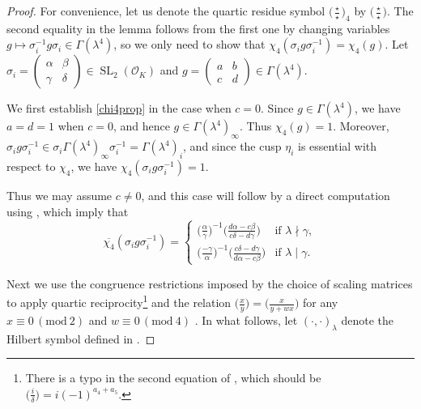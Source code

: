 \documentclass[12pt,reqno]{amsart}
\numberwithin{equation}{section}
\renewcommand{\pmod}[1]{\, (\mathrm{mod}\ #1)}
\DeclareMathOperator{\SL}{SL}
\begin{document}
\begin{proof}
    For convenience, let us denote the quartic residue symbol $\big(\frac{\star}{\star}\big)_4$ by $\big(\frac{\star}{\star}\big)$. The second equality in the lemma follows from the first one by changing variables $g \mapsto \sigma_i^{-1} g \sigma_i \in \Gamma(\lambda^4)$, so we only need to show that $\chi_4(\sigma_i g \sigma_i^{-1}) = \chi_4(g)$.
  Let  $\sigma_i = \left(\begin{smallmatrix}
        \alpha & \beta \\ \gamma & \delta
    \end{smallmatrix}\right) \in \SL_2(\mathcal{O}_K)$ and $g = \left(\begin{smallmatrix}
        a& b \\ c & d
    \end{smallmatrix}\right) \in \Gamma(\lambda^4)$.
    
  We first establish \eqref{chi4prop} in the case when $c=0$.
Since $g\in\Gamma(\lambda^4)$, we have $a=d=1$ when $c=0$,
and hence $g\in\Gamma(\lambda^4)_\infty$. Thus $\chi_4(g)=1$. Moreover,
$ \sigma_i g\sigma_i^{-1}\in \sigma_i\Gamma(\lambda^4)_\infty\sigma_i^{-1}=\Gamma(\lambda^4)_i$,
and since the cusp $\eta_i$ is essential with respect to $\chi_4$, we have
$\chi_4(\sigma_i g\sigma_i^{-1})=1$.

Thus we may assume $c \neq 0$, and this case will follow by a direct computation using \cite[Lemmas 3 and 4]{Suz1}, which imply that
    \begin{equation*}
        \overline{\chi_4}(\sigma_i g \sigma_i^{-1}) = \begin{cases}
            \big(\frac{\alpha}{\gamma}\big)^{-1} \big(\frac{d\alpha - c\beta}{c\delta - d\gamma}\big) & \text{if } \lambda \nmid \gamma, \\
            \big(\frac{-\gamma}{\alpha}\big)^{-1} \big(\frac{c\delta - d\gamma}{d\alpha - c\beta}\big) & \text{if } \lambda \mid \gamma.
        \end{cases}
    \end{equation*} 
  
Next we use the congruence restrictions imposed by the choice of scaling matrices to apply quartic reciprocity\footnote{There is a typo in the second equation of \cite[(2.4)]{Suz1}, which should be $\big(\frac{i}{\delta}\big) = i (-1)^{a_4+a_5}$.} \cite[(2.1) and (2.2)]{Suz1} and the relation $\big(\frac{x}{y}\big) = \big(\frac{x}{y + wx}\big)$ for any $x\equiv 0\pmod{2}$ and $w \equiv 0 \pmod{4}$ \cite[(2.5)]{Suz1}. In what follows, let $(\cdot ,\cdot)_{\lambda}$ denote the Hilbert symbol
defined in \cite[pg.~72]{Suz1}.
        

\end{proof}
\end{document}
